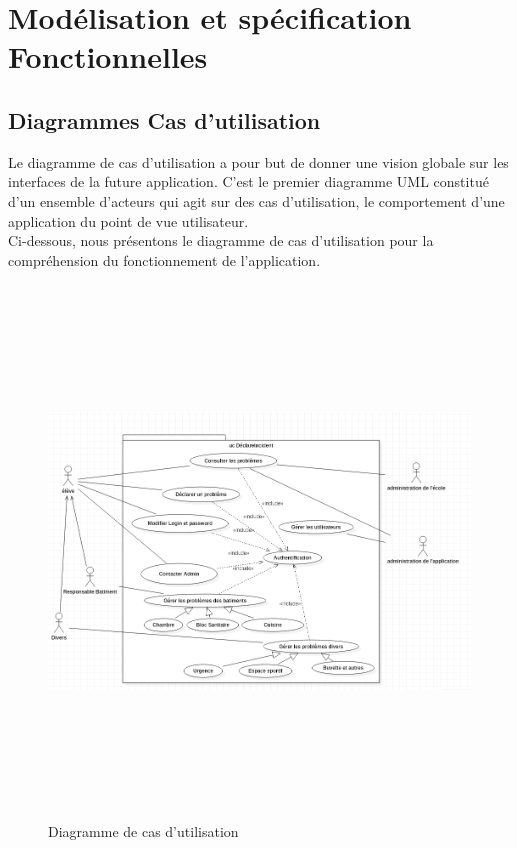 \documentclass[11.5pt]{report}
\begin{document}
\section{Modélisation et spécification Fonctionnelles }

\subsection{Diagrammes Cas d’utilisation }
Le diagramme de cas d’utilisation a pour but de donner une vision globale sur les interfaces de la future application. C’est le premier diagramme UML constitué d’un ensemble d’acteurs qui agit sur des cas d’utilisation, le comportement d’une application du point de vue utilisateur.\\
Ci-dessous, nous présentons le diagramme de cas d’utilisation pour la compréhension du fonctionnement de l’application.\\
\begin{figure}[h]
	
	\begin{center}
		\includegraphics[width=400pt,height=400pt]{Usecase.png} 
		\caption{Diagramme de cas d'utilisation}
	\end{center}
	
\end{figure}
\newpage
\end{document}
